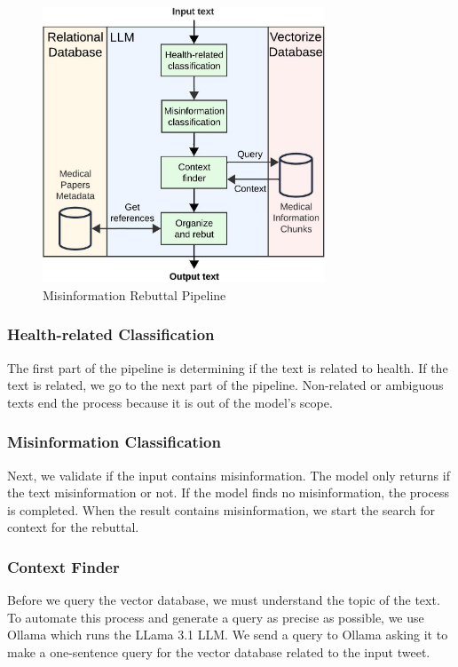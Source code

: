 \begin{figure}[!htb]
	\begin{center}
		\includegraphics[width=0.75\textwidth]{figures/LLM_Pipeline.jpeg} 
	\end{center}
	\caption{Misinformation Rebuttal Pipeline}
	\label{fig:llm}
\end{figure}


\subsubsection{Health-related Classification}
The first part of the pipeline is determining if the text is related to health. If the text is related, we go to the next part of the pipeline. Non-related or ambiguous texts end the process because it is out of the model's scope. 

\subsubsection{Misinformation Classification}
Next, we validate if the input contains misinformation. The model  only returns if the text misinformation or not. If the model finds no misinformation, the process is completed. When the result contains misinformation, we start the search for context for the rebuttal.

\subsubsection{Context Finder}
Before we  query the vector database, we must understand the topic of the text. To automate this process and generate a query as precise as possible, we use Ollama \cite{ollama} which runs the LLama 3.1 LLM. We send a query to Ollama asking it to make a one-sentence query for the vector database related to the input tweet.

